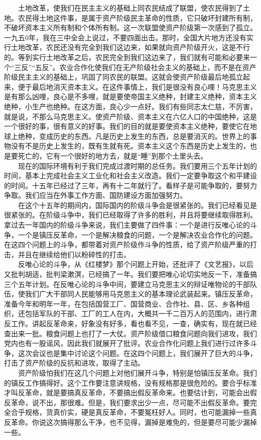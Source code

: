 \documentclass[cn,11pt,chinese]{elegantbook}
\begin{document}
　　土地改革，使我们在民主主义的基础上同农民结成了联盟，使农民得到了土地。农民得土地这件事，是属于资产阶级民主革命的性质，它只破坏封建所有制，不破坏资本主义所有制和个体所有制。这一次联盟使资产阶级第一次感到了孤立。一九五0年，我在三中全会上说过，不要四面出击。那时，全国大片地方还没有实行土地改革，农民还没有完全到我们这边来，如果就向资产阶级开火，这是不行的。等到实行土地改革之后，农民完全到我们这边来了，我们就有可能和必要来一个“三反”“五反”。农业合作化使我们在无产阶级社会主义的基础上，而不是在资产阶级民主主义的基础上，巩固了同农民的联盟。这就会使资产阶级最后地孤立起来，便于最后地消灭资本主义。在这件事情上，我们是很没有良心哩！马克思主义是有那么凶哩，良心是不多哩，就是要使帝国主义绝种，封建主义绝种，资本主义绝种，小生产也绝种。在这方面，良心少一点好。我们有些同志太仁慈，不厉害，就是说，不那么马克思主义。使资产阶级、资本主义在六亿人口的中国绝种，这是一个很好的事，很有意义的好事。我们的目的就是要使资本主义绝种，要使它在地球上绝种，变成历史的东西。凡是历史上发生的东西，总是要消灭的。世界上的事物没有不是历史上发生的，既有生就有死。资本主义这个东西是历史上发生的，也是要死亡的，它有一个很好的地方去，就是“睡”到那个土里头去。\\
　　现在的国际环境有利于我们完成过渡时期的总任务。我们要用三个五年计划的时间，基本上完成社会主义工业化和社会主义改造。我们一定要争取这个和平建设的时间。十五年已经过了三年，再有十二年就行了。看样子是可能争取的，要努力争取。我们应当在外事工作方面、国防建设方面加强努力。\\
　　在这个十五年的期间内，国际国内的阶级斗争会是很紧张的。我们已经看见是很紧张的。在阶级斗争中，我们已经取得了许多的胜利，并且将要继续取得胜利。拿过去一年国内的阶级斗争来说，我们主要做了四件事：一个是进行反唯心论的斗争，一个是镇压反革命，一个是解决粮食的问题，一个是解决农业合作化的问题。在这四个问题上的斗争，都带着对资产阶级作斗争的性质，给了资产阶级严重的打击，并且在继续给他们以粉碎性的打击。\\
　　反唯心论的斗争，从《红楼梦》那个问题上开始，还批评了《文艺报》，以后又批判胡适，批判梁漱溟，已经搞了一年。我们要把唯心论切实地反一下，准备搞三个五年计划。在反唯心论的斗争中间，要建立马克思主义的辩证唯物论的干部队伍，使我们广大干部同人民能够用马克思主义的基本理论武装起来。镇压反革命，准备今年和明年一年，在包括国营工厂、国营商业、合作社、县、区、乡各种组织，还包括军队的干部、工厂的工人在内，大概共一千二百万人的范围内，进行肃反工作。讲起反革命来，好象没有好多，看也看不见，一查，确实有，现在就已经查出来一批。粮食问题上也打了一大仗。资产阶级借口粮食问题向我们进攻，我们党内也有一股谣风，因此我们就展开了批评。农业合作化问题上我们进行过许多斗争，这次会议也是集中讨论这个问题。在这四个问题上，我们展开了巨大的斗争，打击了资产阶级的反抗和进攻，取得了主动。\\
　　资产阶级怕我们在这几个问题上对他们展开斗争，特别是怕镇压反革命。我们的镇反工作搞得好。这个工作要注意讲规格，没有规格那是很危险的。要合乎标准才叫反革命，就是要搞真反革命，不要搞出假反革命来。也要估计到，可能会出假反革命，说不出，那很难。但是，我们要求出少一点，尽可能不出假反革命。要完全合乎规格，货真价实，硬是真反革命，不要冤枉好人。同时，也可能漏掉一些真反革命。你说这次搞得那么干净，也不见得，漏掉是难免的，但是要尽可能少漏掉一些。\\
\end{document}
